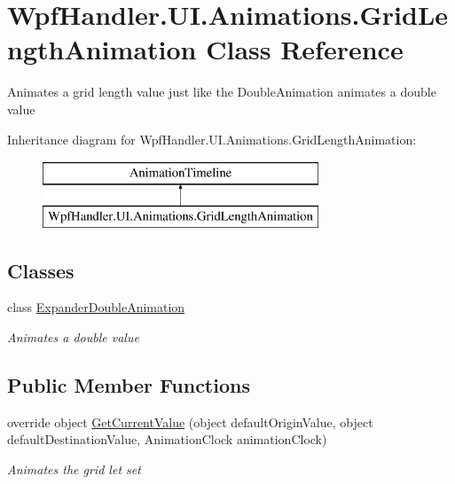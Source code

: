 \hypertarget{class_wpf_handler_1_1_u_i_1_1_animations_1_1_grid_length_animation}{}\section{Wpf\+Handler.\+U\+I.\+Animations.\+Grid\+Length\+Animation Class Reference}
\label{class_wpf_handler_1_1_u_i_1_1_animations_1_1_grid_length_animation}


Animates a grid length value just like the Double\+Animation animates a double value  


Inheritance diagram for Wpf\+Handler.\+U\+I.\+Animations.\+Grid\+Length\+Animation\+:\begin{figure}[H]
\begin{center}
\leavevmode
\includegraphics[height=2.000000cm]{de/d1a/class_wpf_handler_1_1_u_i_1_1_animations_1_1_grid_length_animation}
\end{center}
\end{figure}
\subsection*{Classes}
\begin{DoxyCompactItemize}
\item 
class \mbox{\hyperlink{class_wpf_handler_1_1_u_i_1_1_animations_1_1_grid_length_animation_1_1_expander_double_animation}{Expander\+Double\+Animation}}
\begin{DoxyCompactList}\small\item\em Animates a double value \end{DoxyCompactList}\end{DoxyCompactItemize}
\subsection*{Public Member Functions}
\begin{DoxyCompactItemize}
\item 
override object \mbox{\hyperlink{class_wpf_handler_1_1_u_i_1_1_animations_1_1_grid_length_animation_ae2f932054a13cdbe756f997ca4981708}{Get\+Current\+Value}} (object default\+Origin\+Value, object default\+Destination\+Value, Animation\+Clock animation\+Clock)
\begin{DoxyCompactList}\small\item\em Animates the grid let set \end{DoxyCompactList}\end{DoxyCompactItemize}
